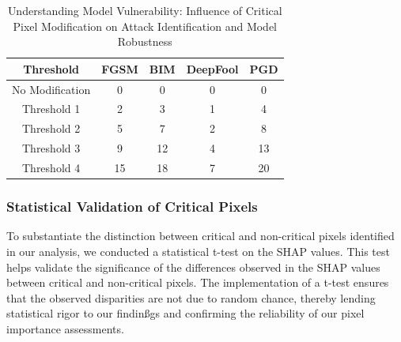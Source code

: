 \documentclass[10pt, conference, a4paper, final]{IEEEtran}
\begin{document}
        
        
        
        
        
        
        
\begin{table}[t]
    \small
    \centering
    \begin{tabular}{|c|c|c|c|c|}
    \hline
    \textbf{Threshold} & \textbf{FGSM} & \textbf{BIM} & \textbf{DeepFool} & \textbf{PGD} \\
    \hline
    No Modification & 0 & 0 & 0 & 0 \\
    \hline
    Threshold 1 & 2 & 3 & 1 & 4 \\
    \hline
    Threshold 2 & 5 & 7 & 2 & 8 \\
    \hline
    Threshold 3 & 9 & 12 & 4 & 13 \\
    \hline
    Threshold 4 & 15 & 18 & 7 & 20 \\
    \hline
    \end{tabular}
    \caption{Understanding Model Vulnerability: Influence of Critical Pixel Modification on Attack Identification and Model Robustness}
    \label{tab:model_robustness_attacks}
    \end{table}
    
\subsubsection{Statistical Validation of Critical Pixels}
To substantiate the distinction between critical and non-critical pixels identified in our analysis, we conducted a statistical t-test on the
 SHAP values. This test helps validate the significance of the differences observed in the SHAP values between critical and non-critical pixels.
  The implementation of a t-test ensures that the observed disparities are not due to random chance, thereby lending statistical rigor to our 
  findinßgs and confirming the reliability of our pixel importance assessments.
\end{document}
